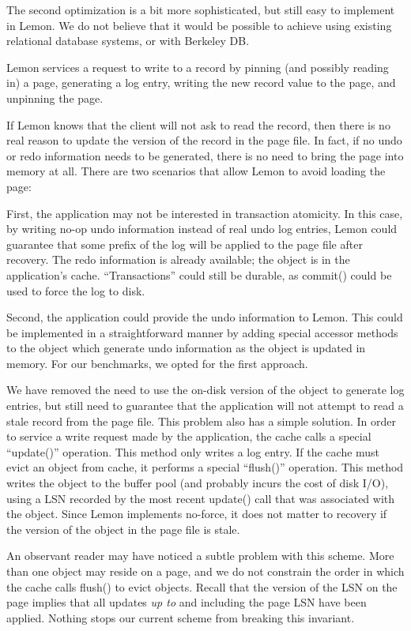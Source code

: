 \documentclass[letterpaper,twocolumn,english]{article}
\newcommand{\yad}{Lemon\xspace}
\begin{document}

The second optimization is a bit more sophisticated, but still easy to
implement in \yad.  We do not believe that it would be possible to
achieve using existing relational database systems, or with Berkeley
DB.  

\yad services a request to write to a record by pinning (and possibly
reading in) a page, generating a log entry, writing the
new record value to the page, and unpinning the page.

If \yad knows that the client will not ask to read the record, then
there is no real reason to update the version of the record in the
page file.  In fact, if no undo or redo information needs to be
generated, there is no need to bring the page into memory at all.
There are two scenarios that allow \yad to avoid loading the page:

First, the application may not be interested in transaction atomicity.
In this case, by writing no-op undo information instead of real undo
log entries, \yad could guarantee that some prefix of the log will be
applied to the page file after recovery.  The redo information is
already available; the object is in the application's cache.
``Transactions'' could still be durable, as commit() could be used to
force the log to disk.

Second, the application could provide the undo information to \yad.
This could be implemented in a straightforward manner by adding
special accessor methods to the object which generate undo information
as the object is updated in memory.  For our benchmarks, we opted for
the first approach.

We have removed the need to use the on-disk version of the object to
generate log entries, but still need to guarantee that the application
will not attempt to read a stale record from the page file.  This
problem also has a simple solution.  In order to service a write
request made by the application, the cache calls a special
``update()'' operation.  This method only writes a log entry.  If the
cache must evict an object from cache, it performs a special ``flush()''
operation.  This method writes the object to the buffer pool (and
probably incurs the cost of disk I/O), using a LSN recorded by the
most recent update() call that was associated with the object.  Since
\yad implements no-force, it does not matter to recovery if the
version of the object in the page file is stale.

An observant reader may have noticed a subtle problem with this
scheme.  More than one object may reside on a page, and we do not
constrain the order in which the cache calls flush() to evict objects.
Recall that the version of the LSN on the page implies that all
updates {\em up to} and including the page LSN have been applied.
Nothing stops our current scheme from breaking this invariant.  
\end{document}
